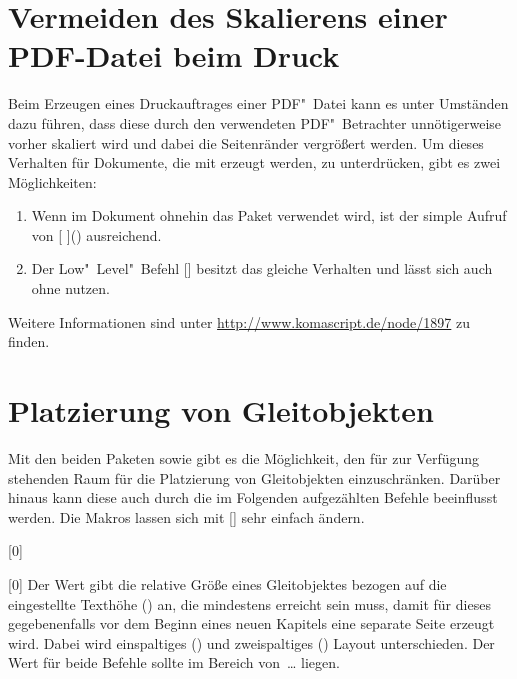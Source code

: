 \section{Vermeiden des Skalierens einer PDF-Datei beim Druck}
%
Beim Erzeugen eines Druckauftrages einer PDF"~Datei kann es unter Umständen 
dazu führen, dass diese durch den verwendeten PDF"~Betrachter unnötigerweise 
vorher skaliert wird und dabei die Seitenränder vergrößert werden. Um dieses 
Verhalten für Dokumente, die mit  erzeugt werden, zu 
unterdrücken, gibt es zwei Möglichkeiten:
%
\begin{enumerate}
\item Wenn im Dokument ohnehin das Paket  verwendet wird, 
  ist der simple Aufruf von
  [%
  ]()
  ausreichend.
\item Der Low"~Level"~Befehl
  []
  besitzt das gleiche Verhalten und lässt sich auch ohne  
  nutzen.
\end{enumerate}
%
Weitere Informationen sind unter \url{http://www.komascript.de/node/1897} 
zu finden.



\section{Platzierung von Gleitobjekten}
%
%
%
Mit den beiden Paketen  sowie  gibt es die 
Möglichkeit, den für  zur Verfügung stehenden Raum für die 
Platzierung von Gleitobjekten einzuschränken. Darüber hinaus kann diese auch 
durch die im Folgenden aufgezählten Befehle beeinflusst werden. Die Makros 
lassen sich mit [] 
sehr einfach ändern.

\begin{Declaration}{}[0\floatpagefraction]
\begin{Declaration}{}[0\dblfloatpagefraction]
\printdeclarationlist%
%
Der Wert gibt die relative Größe eines Gleitobjektes bezogen auf die 
eingestellte Texthöhe () an, die mindestens erreicht sein 
muss, damit für dieses gegebenenfalls vor dem Beginn eines neuen Kapitels eine 
separate Seite erzeugt wird. Dabei wird einspaltiges 
() und zweispaltiges () 
Layout unterschieden. Der Wert für beide Befehle sollte im Bereich 
von~\dots{} liegen.
\end{Declaration}
\end{Declaration}


